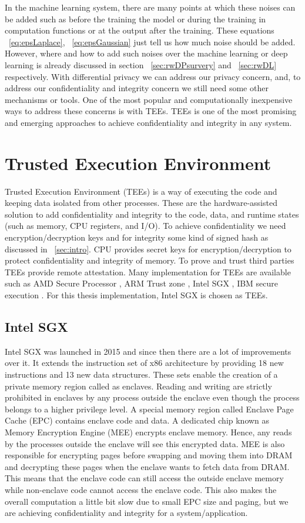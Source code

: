 In the machine learning system, there are many points at which these noises can be added such as before the training the model or during the training in computation functions or at the output after the training. These equations ~\ref{eq:epsLaplace}, ~\ref{eq:epsGaussian} just tell us how much noise should be added. However, where and how to add such noises over the machine learning or deep learning is already discussed in section ~\ref{sec:rwDPsurvery} and ~\ref{sec:rwDL} respectively. With differential privacy we can address our privacy concern, and, to address our confidentiality and integrity concern we still need some other mechanisms or tools. One of the most popular and computationally inexpensive ways to address these concerns is with TEEs. TEEs is one of the most promising and emerging approaches to achieve confidentiality and integrity in any system.

\section{Trusted Execution Environment}
Trusted Execution Environment (TEEs) \cite{59} is a way of executing the code and keeping data isolated from other processes. These are the hardware-assisted solution to add confidentiality and integrity to the code, data, and runtime states (such as memory, CPU registers, and I/O). To achieve confidentiality we need encryption/decryption keys and for integrity some kind of signed hash as discussed in ~\ref{sec:intro}. CPU provides secret keys for encryption/decryption to protect confidentiality and integrity of memory. To prove and trust third parties TEEs provide remote attestation.  Many implementation for TEEs are available such as AMD Secure Processor \cite{19}, ARM Trust zone \cite{20}, Intel SGX \cite{9}, IBM secure execution \cite{21}. For this thesis implementation, Intel SGX is chosen as TEEs. 

\subsection{Intel SGX}
Intel SGX \cite{9} was launched in 2015 and since then there are a lot of improvements over it. It extends the instruction set of x86 architecture by providing 18 new instructions and 13 new data structures. These sets enable the creation of a private memory region called as enclaves. Reading and writing are strictly prohibited in enclaves by any process outside the enclave even though the process belongs to a higher privilege level. A special memory region called Enclave Page Cache (EPC) contains enclave code and data. A dedicated chip known as Memory Encryption Engine (MEE) encrypts enclave memory. Hence, any reads by the processes outside the enclave will see this encrypted data. MEE is also responsible for encrypting pages before swapping and moving them into DRAM and decrypting these pages when the enclave wants to fetch data from DRAM. This means that the enclave code can still access the outside enclave memory while non-enclave code cannot access the enclave code. This also makes the overall computation a little bit slow due to small EPC size and paging, but we are achieving confidentiality and integrity for a system/application.

